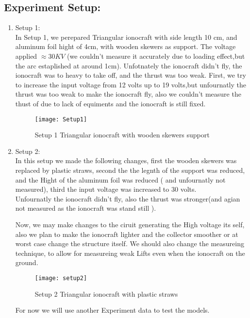 \documentclass[a4paper,11pt,table]{article}
\begin{document}
\subsection{Experiment Setup:}
\begin{enumerate}
	\item Setup 1:\\
	In Setup 1, we perepared Triangular ionocraft with side length
	10 cm, and aluminum foil hight of 4cm,
	with wooden skewers as support.
	The voltage applied $\approx 30KV$ (we couldn't measure it
	accurately due to loading effect,but the arc estaplished at
	around 1cm).
	Unfotnately the ionocraft didn't fly, the ionocraft was to
	heavy to take off, and the thrust was too weak.
	First, we try to increase the input voltage from 12 volts up
	to 19 volts,but unfournatly the thrust was too weak to make
	the ionocraft fly, also we couldn't measure the thust of
	due to lack of  equiments and the ionocraft is still fixed.

\begin{figure}[ht]
	\centering
	\texttt{[image: Setup1]}
	\caption{Setup 1 Triangular ionocraft with wooden skewers
	support}
\end{figure}

	\item Setup 2:\\
	In this setup we made the following changes, first the wooden
	skewers was replaced by plastic straws, second the the legnth
	of the support was reduced, and the Hight of the aluminum foil
	was reduced ( and unfournatly not measured), third the input
	voltage was increased to 30 volts.\\
	Unfournatly the ionocraft didn't fly, also the thrust was
	stronger(and agian not measured as the ionocraft was stand still
	).
	
	Now, we may make changes to the ciruit generating the High
	voltage its self, also we plan to make the ionocraft lighter
	and the collector smoother
	or at worst case change the structure itself.
	We should also change the measureing technique, to allow for
	measureing weak Lifts even when the ionocraft on the ground.
	\begin{figure}[ht]
		\centering
		\texttt{[image: setup2]}
		\caption{Setup 2 Triangular ionocraft with plastic straws}
	\end{figure}

	For now we will use another Experiment data to test the models.
\end{enumerate}
\end{document}
